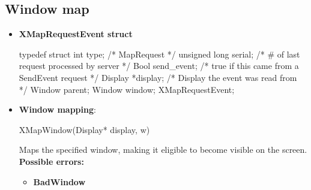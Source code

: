 \documentclass{report}
\begin{document}
    \subsection{Window map}
    \begin{itemize}
        \item \textbf{XMapRequestEvent struct}
            \bigbreak \noindent 
            \begin{cppcode}
                typedef struct {
                    int type; /* MapRequest */
                    unsigned long serial; /* # of last request processed by server */
                    Bool send_event; /* true if this came from a SendEvent request */
                    Display *display; /* Display the event was read from */
                    Window parent;
                    Window window;
                } XMapRequestEvent;
            \end{cppcode}
        \item \textbf{Window mapping}:
            \bigbreak \noindent 
            \begin{cppcode}
                XMapWindow(Display* display, w)
            \end{cppcode}
            \bigbreak \noindent
            Maps the specified window, making it eligible to become visible on the screen.
            \bigbreak \noindent
            \textbf{Possible errors:}
            \begin{itemize}
                \item \textbf{BadWindow}
            \end{itemize}



    \end{itemize}

    \pagebreak 
\end{document}
